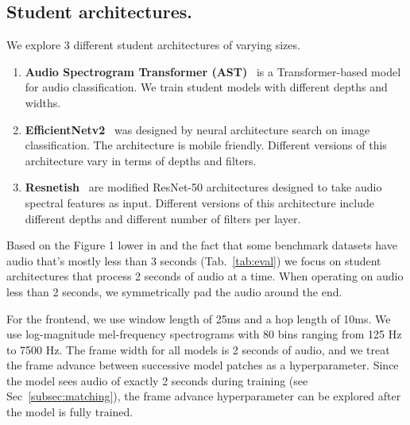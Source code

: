 \subsection{Student architectures.}
\label{sec:kd}
We explore 3 different student architectures of varying sizes.
\begin{enumerate}\itemsep0em
    \item \textbf{Audio Spectrogram Transformer (AST)}~\cite{ast} is a Transformer-based model for audio classification. We train student models with different depths and widths.
    
    \item \textbf{EfficientNetv2}~\cite{efficientnetv2} was designed by neural architecture search on image classification. The architecture is mobile friendly. Different versions of this architecture vary in terms of depths and filters.
    
    \item \textbf{Resnetish}~\cite{hershey2017cnn} are modified ResNet-50 architectures designed to take audio spectral features as input. Different versions of this architecture include different depths and different number of filters per layer.
\end{enumerate}





Based on the Figure 1 lower in \cite{cap12} and the fact that some benchmark datasets have audio that's mostly less than 3 seconds (Tab.~\ref{tab:eval})  we focus on student architectures that process 2 seconds of audio at a time. When operating on audio less than 2 seconds, we symmetrically pad the audio around the end.

For the frontend, we use window length of 25ms and a hop length of 10ms. We use log-magnitude mel-frequency spectrograms with 80 bins ranging from 125 Hz to 7500 Hz. The frame width for all models is 2 seconds of audio, and we treat the frame advance between successive model patches as a hyperparameter. Since the model sees audio of exactly 2 seconds during training (see Sec~\ref{subsec:matching}), the frame advance hyperparameter can be explored after the model is fully trained.


